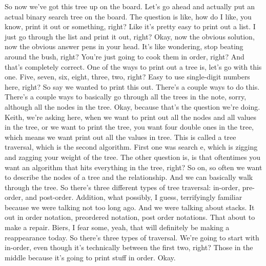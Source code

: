 So now we've got this tree up on the board. Let's go ahead and actually put an actual binary search tree on the board. The question is like, how do I like, you know, print it out or something, right? Like it's pretty easy to print out a list. I just go through the list and print it out, right? Okay, now the obvious solution, now the obvious answer pens in your head. It's like wondering, stop beating around the bush, right? You're just going to cook them in order, right? And that's completely correct. One of the ways to print out a tree is, let's go with this one. Five, seven, six, eight, three, two, right? Easy to use single-digit numbers here, right? So say we wanted to print this out. There's a couple ways to do this. There's a couple ways to basically go through all the trees in the note, sorry, although all the nodes in the tree. Okay, because that's the question we're doing. Keith, we're asking here, when we want to print out all the nodes and all values in the tree, or we want to print the tree, you want four double ones in the tree, which means we want print out all the values in tree. This is called a tree traversal, which is the second algorithm. First one was search e, which is zigging and zagging your weight of the tree. The other question is, is that oftentimes you want an algorithm that hits everything in the tree, right? So on, so often we want to describe the nodes of a tree and the relationship. And we can basically walk through the tree. So there's three different types of tree traversal: in-order, pre-order, and post-order. Addition, what possibly, I guess, terrifyingly familiar because we were talking not too long ago. And we were talking about stacks. It out in order notation, preordered notation, post order notations. That about to make a repair. Biers, I fear some, yeah, that will definitely be making a reappearance today. So there's three types of traversal. We're going to start with in-order, even though it's technically between the first two, right? Those in the middle because it's going to print stuff in order. Okay.

